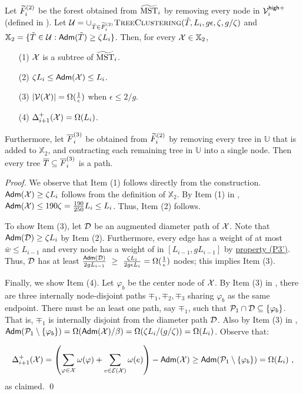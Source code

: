 \begin{lemma}[Step 2]\label{lm:Clustering-Step2T2} Let $\widetilde{F}^{(2)}_i$ be the forest obtained from $\widetilde{\mathrm{MST}}_{i}$ by removing every node in $\mathcal{V}^{\mathsf{high}+}_i$ (defined in ). Let $\mathcal{U} = \cup_{\tilde{T}\in \widetilde{F}^{(2)}_i} \textsc{TreeClustering}(\tilde{T},L_i,g\epsilon,\zeta,g/\zeta)$ and  $\mathbb{X}_2 = \{\tilde{T} \in \mathcal{U}: \mathsf{Adm}(\tilde{T})\geq \zeta L_i\}$. Then, for every $\mathcal{X} \in \mathbb{X}_2$, 
	\begin{enumerate}[noitemsep]
		\item[(1)] $\mathcal{X}$ is a subtree of $\widetilde{\mathrm{MST}}_{i}$.
		\item[(2)] $\zeta L_i \leq \mathsf{Adm}(\mathcal{X})\leq L_i$.
		\item[(3)] $|\mathcal{V}(\mathcal{X})| = \Omega(\frac{1}{\epsilon})$  when $\epsilon \leq 2/g$. 
		\item[(4)] $\Delta^+_{i+1}(\mathcal{X})  = \Omega(L_i)$.
 	\end{enumerate}

Furthermore, let $\overline{F}^{(3)}_i$ be obtained from $\widetilde{F}^{(2)}_i$ by removing every tree in $\mathbb{U}$ that is added to $\mathbb{X}_2$, and contracting each remaining tree in $\mathbb{U}$ into a single node.  Then every tree $\overline{T} \subseteq \overline{F}^{(3)}_i$ is a path.
\end{lemma}
\begin{proof} We observe that Item (1) follows directly from the construction. $\mathsf{Adm}(\mathcal{X}) \geq \zeta L_i $ follows from the definition of $\mathbb{X}_2$. By Item (1) in , $\mathsf{Adm}(\mathcal{X})\leq 190\zeta  = \frac{190}{250} L_i \leq L_i$. Thus, Item (2) follows.  
	
	To show Item (3), let $\mathcal{D}$ be an augmented diameter path of $\mathcal{X}$. Note that  $\mathsf{Adm}(\mathcal{D})\geq \zeta L_i$ by Item (2). Furthermore, every edge has a weight of at most $\bar{w} \leq L_{i-1}$ and every node has a weight of in $[L_{i-1},gL_{i-1}]$ by \hyperlink{P3'}{property (P3')}. Thus,  $\mathcal{D}$ has at least $\frac{\mathsf{Adm}(\mathcal{D})}{2gL_{i-1}} ~\geq~ \frac{\zeta L_i}{2g\epsilon L_i} = \Omega(\frac{1}{\epsilon})$ nodes; this implies Item (3).
	
	Finally, we show Item (4). Let $\varphi_b$ be the center node of $\mathcal{X}$. By Item (3) in , there are three internally node-disjoint paths $\mp_1,\mp_2, \mp_3$ sharing $\varphi_b$ as the same endpoint. There must be an least one path, say $\mp_1$, such that $\mathcal{P}_1\cap \mathcal{D} \subseteq \{\varphi_b\}$. That is, $\mp_1$ is internally disjoint from the diameter path $\mathcal{D}$. Also by Item (3) in , $\mathsf{Adm}(\mathcal{P}_1\setminus \{\varphi_{b}\}) = \Omega(\mathsf{Adm}(\mathcal{X})/\beta) = \Omega(\zeta L_i/(g/\zeta)) = \Omega(L_i)$. Observe that:
	
	\begin{equation*}
		\begin{split}
			\Delta^+_{i+1}(\mathcal{X}) =  \left(\sum_{\varphi \in \mathcal{X}}\omega(\varphi) + \sum_{ e\in \mathcal{E}(\mathcal{X})} \omega(e)\right) - \mathsf{Adm}(\mathcal{X}) \geq \mathsf{Adm}(\mathcal{P}_1\setminus \{\varphi_{b}\})  = \Omega(L_i)~,
		\end{split}
	\end{equation*}
	as claimed.	\qed
\end{proof}


